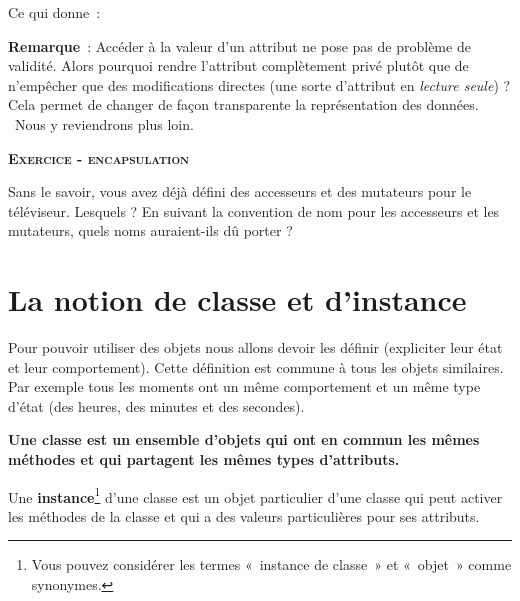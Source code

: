 
\bigskip

Ce qui donne~:


\textbf{Remarque}~: Accéder à la valeur d’un attribut ne pose pas de
problème de validité. Alors pourquoi rendre l’attribut complètement
privé plutôt que de n’empêcher que des modifications directes (une
sorte d’attribut en \textit{lecture seule}) ? Cela permet de changer de
façon transparente la représentation des données. \ Nous y reviendrons
plus loin.

{\sffamily\bfseries\scshape
Exercice - encapsulation}

Sans le savoir, vous avez déjà défini des accesseurs et des 
mutateurs pour le téléviseur. Lesquels ? En suivant la convention
de nom pour les accesseurs et les mutateurs, 
quels noms auraient-ils dû porter ?


\section{La notion de classe et d'instance}

Pour pouvoir utiliser des objets nous allons devoir les définir
(expliciter leur état et leur comportement). Cette définition est
commune à tous les objets similaires. Par exemple tous les moments ont
un même comportement et un même type d'état (des heures, des minutes et
des secondes).

{\sffamily\bfseries\upshape
{
Une \textbf{classe} est un ensemble d'objets qui ont en
commun les mêmes méthodes et qui partagent les mêmes types
d'attributs.}}

Une \textbf{instance}\footnote{Vous pouvez considérer les termes
«~instance de classe~» et «~objet~» comme synonymes. }
d'une classe est un objet particulier
d'une classe qui peut activer les méthodes de la
classe et qui a des valeurs particulières pour ses attributs.

